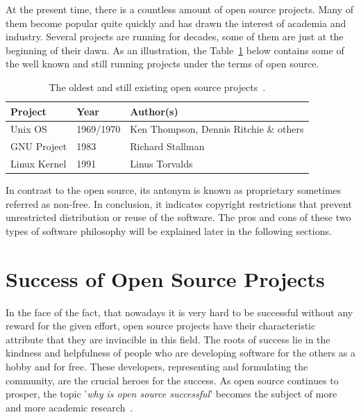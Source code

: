 \documentclass[11pt,a4paper]{article}
\theoremstyle{definition}
\begin{document}
    At the present time, there is a countless amount of open source projects. Many of them become popular quite quickly and has drawn the interest of academia and industry. Several projects are running for decades, some of them are just at the beginning of their dawn. As an illustration, the Table~\ref{tab:open-source-projects} below contains some of the well known and still running projects under the terms of open source.\\

    \begin{table}[H]
        \begin{center}
            \begin{tabular}{l|l|l}
                Project      & Year      & Author(s)                              \\
                \hline
                Unix OS      & 1969/1970 & Ken Thompson, Dennis Ritchie \& others \\
                GNU Project  & 1983      & Richard Stallman                       \\
                Linux Kernel & 1991      & Linus Torvalds                         \\[-5mm]
            \end{tabular}
        \end{center}
        \caption{The oldest and still existing open source projects~\cite{SD:linux-kernel, WP:gnu-proj-init, DLACM:history-of-unix}.}
        \label{tab:open-source-projects}
    \end{table}

    In contrast to the open source, its antonym is known as proprietary sometimes referred as non-free. In conclusion, it indicates copyright restrictions that prevent unrestricted distribution or reuse of the software. The pros and cons of these two types of software philosophy will be explained later in the following sections.

\section{Success of Open Source Projects}

    In the face of the fact, that nowadays it is very hard to be successful without any reward for the given effort, open source projects have their characteristic attribute that they are invincible in this field. The roots of success lie in the kindness and helpfulness of people who are developing software for the others as a hobby and for free. These developers, representing and formulating the community, are the crucial heroes for the success. As open source continues to prosper, the topic '\textit{why is open source successful}' becomes the subject of more and more academic research~\cite{IEEE:open-source-success}.
\end{document}
